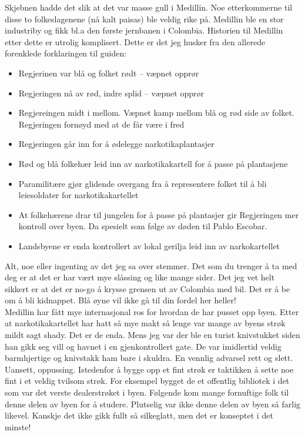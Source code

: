 Skjebnen hadde det slik at det var masse gull i Medillin. Noe
etterkommerne til disse to folkeslagenene (nå kalt paisas) ble veldig
rike på. Medillin ble en stor industriby og fikk bl.a den første
jernbanen i Colombia. Historien til Medillin etter dette er utrolig
komplisert. Dette er det jeg husker fra den allerede forenklede
forklaringen til guiden:

\begin{itemize}
	\item Regjerinen var blå og folket rødt -- væpnet opprør
	\item Regjeringen nå av rød, indre splid -- væpnet opprør
	\item Regjereingen midt i mellom. Væpnet kamp mellom blå og
		rød side av folket. Regjeringen fornøyd med at de får
		være i fred
	\item Regjeringen går inn for å ødelegge narkotikaplantasjer
	\item Rød og blå folkehær leid inn av narkotikakartell for å
		passe på plantasjene
	\item Paramilitære gjør glidende overgang fra å representere folket
		til å bli
		leiesoldater for narkotikakartellet
	\item At folkehærene drar til jungelen for å passe på
		plantasjer gir Regjeringen mer kontroll over byen. Da
		spesielt som følge av døden til Pablo Escobar.
	\item Landsbyene er enda kontrollert av lokal gerilja leid inn
		av narkokartellet

	
\end{itemize}

Alt, noe eller ingenting av det jeg sa over stemmer. Det som du
trenger å ta med deg er at det er har vært mye slåssing og like mange
sider. Det jeg vet helt sikkert er at det er no-go å krysse grensen ut
av Colombia med bil. Det er å be
om å bli kidnappet. Blå øyne vil ikke gå til din fordel her heller!\\

Medillin har fått mye internasjonal ros for hvordan de har pusset opp byen.
Etter at narkotikakartellet har hatt så mye makt så lenge var mange av
byens strøk mildt sagt shady. Det er de enda. Mens jeg var der ble en
turist knivstukket siden han gikk seg vill og havnet i en
gjenkontrollert gate. De var imidlertid veldig barmhjertige og
knivstakk ham bare i skuldra. En vennlig advarsel rett og slett.
Uansett, oppussing. Istedenfor å bygge opp et fint strøk er taktikken
å sette noe fint i et veldig tvilsom strøk. For eksempel
bygget de et offentlig bibliotek i det som var det verste
dealerstrøket i byen. Følgende kom mange fornuftige folk til denne
delen av byen for å studere. Plutselig var ikke denne delen av byen så
farlig likevel. Kanskje det ikke gikk fullt så silkeglatt, men det er
konseptet i det minste!
